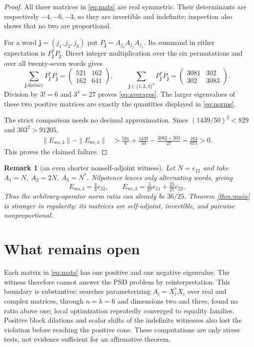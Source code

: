 \documentclass[11pt,a4paper]{article}
\newtheorem{remark}[theorem]{Remark}
\begin{document}
\begin{proof}
All three matrices in \eqref{eq:mats} are real symmetric.  Their determinants
are respectively $-4,-6,-3$, so they are invertible and indefinite; inspection
also shows that no two are proportional.

For a word $\mathbf j=(j_1,j_2,j_3)$ put
$P_{\mathbf j}=A_{j_3}A_{j_2}A_{j_1}$.  Its summand in either expectation is
$P_{\mathbf j}^*P_{\mathbf j}$.  Direct integer multiplication over the six
permutations and over all twenty-seven words gives
\[
 \sum_{\mathbf j\ \mathrm{distinct}}P_{\mathbf j}^*P_{\mathbf j}
 =\begin{pmatrix}521&162\\162&641\end{pmatrix},\qquad
 \sum_{\mathbf j\in\{1,2,3\}^3}P_{\mathbf j}^*P_{\mathbf j}
 =\begin{pmatrix}3081&302\\302&3083\end{pmatrix}.
\]
Division by $3!=6$ and $3^3=27$ proves \eqref{eq:averages}.  The larger
eigenvalues of these two positive matrices are exactly the quantities displayed
in \eqref{eq:norms}.

The strict comparison needs no decimal approximation.  Since
$(1439/50)^2<829$ and $303^2>91205$,
\begin{align*}
 \|E_{\mathrm{wo},3}\|-\|E_{\mathrm{wr},3}\|
 &>\frac{581}{6}+\frac{1439}{50}-\frac{3082+303}{27}
 =\frac{164}{675}>0.
\end{align*}
This proves the claimed failure.
\end{proof}

\begin{remark}[an even shorter nonself-adjoint witness]
Let $N=e_{12}$ and take $A_1=N$, $A_2=2N$, $A_3=N^*$.  Nilpotence leaves
only alternating words, giving
\[
 E_{\mathrm{wo},3}=\tfrac43e_{22},\qquad
 E_{\mathrm{wr},3}=\tfrac5{27}e_{11}+\tfrac{25}{27}e_{22}.
\]
Thus the arbitrary-operator norm ratio can already be $36/25$.  Theorem
\ref{thm:main} is stronger in regularity: its matrices are self-adjoint,
invertible, and pairwise nonproportional.
\end{remark}

\section{What remains open}

Each matrix in \eqref{eq:mats} has one positive and one negative eigenvalue.
The witness therefore cannot answer the PSD problem by reinterpretation.  This
boundary is substantive: searches parameterizing $A_i=X_i^*X_i$ over real and
complex matrices, through $n=k=6$ and dimensions two and three, found no ratio
above one; local optimization repeatedly converged to equality families.
Positive block dilations and scalar shifts of the indefinite witnesses also
lost the violation before reaching the positive cone.  These computations are
only stress tests, not evidence sufficient for an affirmative theorem.
\end{document}
